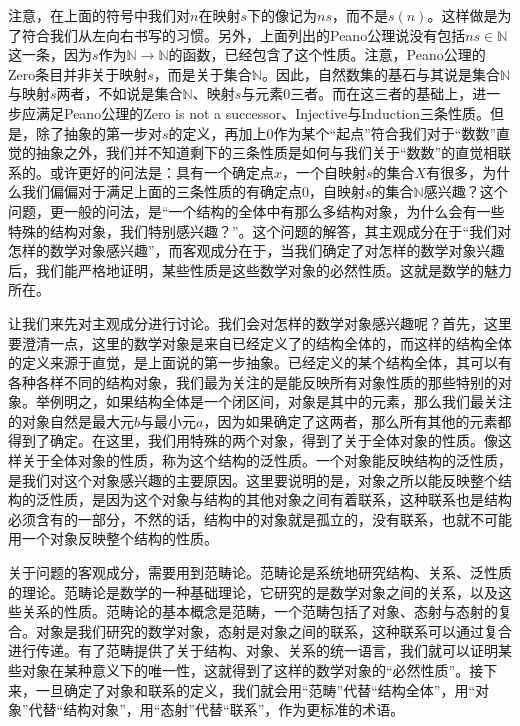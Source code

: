 \documentclass[oneside, 12pt]{ctexart}
\begin{document}
注意，在上面的符号中我们对$n$在映射$s$下的像记为$ns$，而不是$s(n)$。这样做是为了符合我们从左向右书写的习惯。另外，上面列出的Peano公理说没有包括$ns \in \mathbb{N}$这一条，因为$s$作为$\mathbb{N} \to \mathbb{N}$的函数，已经包含了这个性质。注意，Peano公理的Zero条目并非关于映射$s$，而是关于集合$\mathbb{N}$。因此，自然数集的基石与其说是集合$\mathbb{N}$与映射$s$两者，不如说是集合$\mathbb{N}$、映射$s$与元素$0$三者。而在这三者的基础上，进一步应满足Peano公理的Zero is not a successor、Injective与Induction三条性质。但是，除了抽象的第一步对$s$的定义，再加上$0$作为某个“起点”符合我们对于“数数”直觉的抽象之外，我们并不知道剩下的三条性质是如何与我们关于“数数”的直觉相联系的。或许更好的问法是：具有一个确定点$x$，一个自映射$s$的集合$X$有很多，为什么我们偏偏对于满足上面的三条性质的有确定点$0$，自映射$s$的集合$\mathbb{N}$感兴趣？这个问题，更一般的问法，是“一个结构的全体中有那么多结构对象，为什么会有一些特殊的结构对象，我们特别感兴趣？”。这个问题的解答，其主观成分在于“我们对怎样的数学对象感兴趣”，而客观成分在于，当我们确定了对怎样的数学对象兴趣后，我们能严格地证明，某些性质是这些数学对象的必然性质。这就是数学的魅力所在。

让我们来先对主观成分进行讨论。我们会对怎样的数学对象感兴趣呢？首先，这里要澄清一点，这里的数学对象是来自已经定义了的结构全体的，而这样的结构全体的定义来源于直觉，是上面说的第一步抽象。已经定义的某个结构全体，其可以有各种各样不同的结构对象，我们最为关注的是能反映所有对象性质的那些特别的对象。举例明之，如果结构全体是一个闭区间，对象是其中的元素，那么我们最关注的对象自然是最大元$b$与最小元$a$，因为如果确定了这两者，那么所有其他的元素都得到了确定。在这里，我们用特殊的两个对象，得到了关于全体对象的性质。像这样关于全体对象的性质，称为这个结构的泛性质。一个对象能反映结构的泛性质，是我们对这个对象感兴趣的主要原因。这里要说明的是，对象之所以能反映整个结构的泛性质，是因为这个对象与结构的其他对象之间有着联系，这种联系也是结构必须含有的一部分，不然的话，结构中的对象就是孤立的，没有联系，也就不可能用一个对象反映整个结构的性质。

关于问题的客观成分，需要用到范畴论。范畴论是系统地研究结构、关系、泛性质的理论。范畴论是数学的一种基础理论，它研究的是数学对象之间的关系，以及这些关系的性质。范畴论的基本概念是范畴，一个范畴包括了对象、态射与态射的复合。对象是我们研究的数学对象，态射是对象之间的联系，这种联系可以通过复合进行传递。有了范畴提供了关于结构、对象、关系的统一语言，我们就可以证明某些对象在某种意义下的唯一性，这就得到了这样的数学对象的“必然性质”。接下来，一旦确定了对象和联系的定义，我们就会用“范畴”代替“结构全体”，用“对象”代替“结构对象”，用“态射”代替“联系”，作为更标准的术语。
\end{document}
